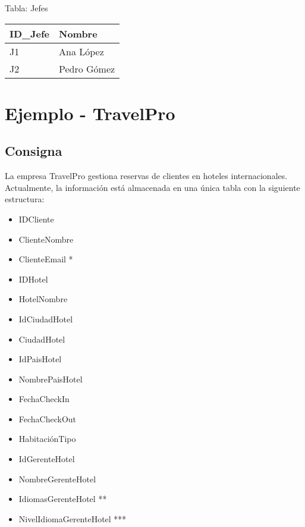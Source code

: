 \documentclass[12pt]{article}
\begin{document}
Tabla: Jefes
\begin{center}
\begin{tabular}{ll}
\toprule
ID\_Jefe & Nombre \\
\midrule
J1 & Ana López \\
J2 & Pedro Gómez \\
\bottomrule
\end{tabular}
\end{center}

\section{Ejemplo - TravelPro}

\subsection{Consigna}
La empresa TravelPro gestiona reservas de clientes en hoteles internacionales. Actualmente, la información está almacenada en una única tabla con la siguiente estructura:

\vspace{1em}

\begin{minipage}[t]{0.48\textwidth}
\begin{itemize}
    \item IDCliente
    \item ClienteNombre
    \item ClienteEmail *
    \item IDHotel
    \item HotelNombre
    \item IdCiudadHotel
    \item CiudadHotel
    \item IdPaisHotel
\end{itemize}
\end{minipage}
\hfill
\begin{minipage}[t]{0.48\textwidth}
\begin{itemize}
    \item NombrePaisHotel
    \item FechaCheckIn
    \item FechaCheckOut
    \item HabitaciónTipo
    \item IdGerenteHotel
    \item NombreGerenteHotel
    \item IdiomasGerenteHotel **
    \item NivelIdiomaGerenteHotel ***
\end{itemize}
\end{minipage}
\end{document}

